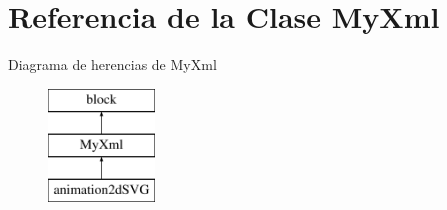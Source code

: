 \hypertarget{classMyXml}{}\section{Referencia de la Clase My\+Xml}
\label{classMyXml}
Diagrama de herencias de My\+Xml\begin{figure}[H]
\begin{center}
\leavevmode
\includegraphics[height=3.000000cm]{classMyXml}
\end{center}
\end{figure}
